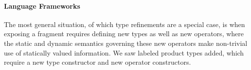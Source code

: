 \documentclass[10pt,preprint]{sigplanconf}
\begin{document}
\paragraph{Language Frameworks}
The most general situation, of which type refinements are a special case, is when exposing a fragment requires defining new types as well as new operators, where the static and dynamic semantics governing these new operators make non-trivial use of  statically valued information. 
We saw labeled product types added, which require a new type constructor and new operator constructors.%


\end{document}
